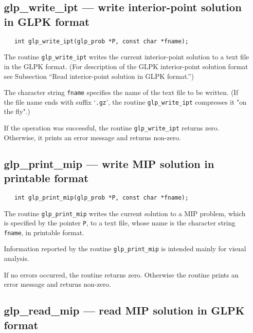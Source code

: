 \subsection{glp\_write\_ipt --- write interior-point solution in GLPK
format}

\synopsis

\begin{verbatim}
   int glp_write_ipt(glp_prob *P, const char *fname);
\end{verbatim}

\description

The routine \verb|glp_write_ipt| writes the current interior-point
solution to a text file in the GLPK format. (For description of the
GLPK interior-point solution format see Subsection ``Read
interior-point solution in GLPK format.'')

The character string \verb|fname| specifies the name of the text file
to be written. (If the file name ends with suffix `\verb|.gz|', the
routine \verb|glp_write_ipt| compresses it "on the fly".)

\returns

If the operation was successful, the routine \verb|glp_write_ipt|
returns zero. Otherwise, it prints an error message and returns
non-zero.

\subsection{glp\_print\_mip --- write MIP solution in printable format}

\synopsis

\begin{verbatim}
   int glp_print_mip(glp_prob *P, const char *fname);
\end{verbatim}

\description

The routine \verb|glp_print_mip| writes the current solution to a MIP
problem, which is specified by the pointer \verb|P|, to a text file,
whose name is the character string \verb|fname|, in printable format.

Information reported by the routine \verb|glp_print_mip| is intended
mainly for visual analysis.

\returns

If no errors occurred, the routine returns zero. Otherwise the routine
prints an error message and returns non-zero.

\subsection{glp\_read\_mip --- read MIP solution in GLPK format}

